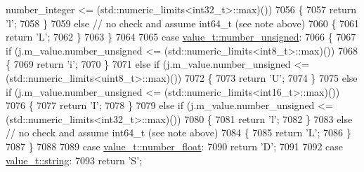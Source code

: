 \begin{DoxyCode}
      number\_integer <= (std::numeric\_limits<int32\_t>::max)())
7056                 \{
7057                     \textcolor{keywordflow}{return} \textcolor{charliteral}{'l'};
7058                 \}
7059                 \textcolor{keywordflow}{else}  \textcolor{comment}{// no check and assume int64\_t (see note above)}
7060                 \{
7061                     \textcolor{keywordflow}{return} \textcolor{charliteral}{'L'};
7062                 \}
7063             \}
7064 
7065             \textcolor{keywordflow}{case} \hyperlink{namespacenlohmann_1_1detail_a1ed8fc6239da25abcaf681d30ace4985adce7cc8ec29055c4158828921f2f265e}{value\_t::number\_unsigned}:
7066             \{
7067                 \textcolor{keywordflow}{if} (j.m\_value.number\_unsigned <= (std::numeric\_limits<int8\_t>::max)())
7068                 \{
7069                     \textcolor{keywordflow}{return} \textcolor{charliteral}{'i'};
7070                 \}
7071                 \textcolor{keywordflow}{else} \textcolor{keywordflow}{if} (j.m\_value.number\_unsigned <= (std::numeric\_limits<uint8\_t>::max)())
7072                 \{
7073                     \textcolor{keywordflow}{return} \textcolor{charliteral}{'U'};
7074                 \}
7075                 \textcolor{keywordflow}{else} \textcolor{keywordflow}{if} (j.m\_value.number\_unsigned <= (std::numeric\_limits<int16\_t>::max)())
7076                 \{
7077                     \textcolor{keywordflow}{return} \textcolor{charliteral}{'I'};
7078                 \}
7079                 \textcolor{keywordflow}{else} \textcolor{keywordflow}{if} (j.m\_value.number\_unsigned <= (std::numeric\_limits<int32\_t>::max)())
7080                 \{
7081                     \textcolor{keywordflow}{return} \textcolor{charliteral}{'l'};
7082                 \}
7083                 \textcolor{keywordflow}{else}  \textcolor{comment}{// no check and assume int64\_t (see note above)}
7084                 \{
7085                     \textcolor{keywordflow}{return} \textcolor{charliteral}{'L'};
7086                 \}
7087             \}
7088 
7089             \textcolor{keywordflow}{case} \hyperlink{namespacenlohmann_1_1detail_a1ed8fc6239da25abcaf681d30ace4985ad9966ecb59667235a57b4b999a649eef}{value\_t::number\_float}:
7090                 \textcolor{keywordflow}{return} \textcolor{charliteral}{'D'};
7091 
7092             \textcolor{keywordflow}{case} \hyperlink{namespacenlohmann_1_1detail_a1ed8fc6239da25abcaf681d30ace4985ab45cffe084dd3d20d928bee85e7b0f21}{value\_t::string}:
7093                 \textcolor{keywordflow}{return} \textcolor{charliteral}{'S'};

\end{DoxyCode}
